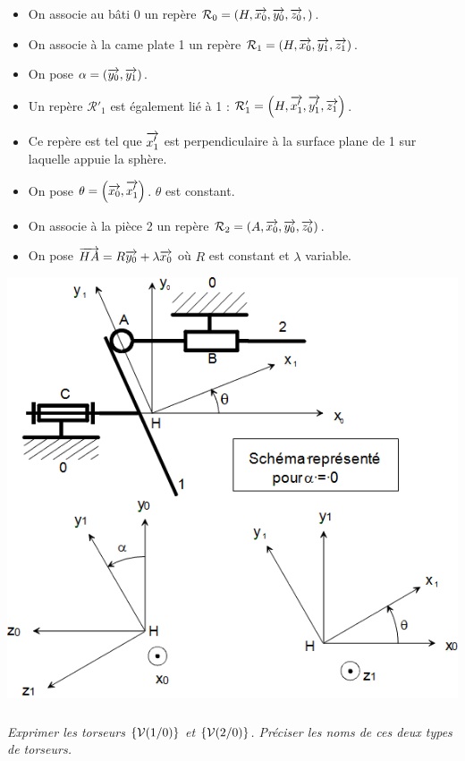 \documentclass[10pt,oneside]{article}
\begin{document}
\begin{itemize}
\item On associe au bâti 0 un repère $\mathcal{R}_0=\left(H,\overrightarrow{x_0},\overrightarrow{y_0},\overrightarrow{z_0}, \right)$.
\item On associe à la came plate 1 un repère  $\mathcal{R}_1=\left(H,\overrightarrow{x_0},\overrightarrow{y_1},\overrightarrow{z_1} \right)$. 
\item On pose  $\alpha=\left( \overrightarrow{y_0}, \overrightarrow{y_1}\right)$.
\item Un repère $\mathcal{R}'_1$ est également lié à 1 : $\mathcal{R}'_1=\left(H,\overrightarrow{x'_1},\overrightarrow{y'_1},\overrightarrow{z_1} \right)$. 
\item Ce repère est tel que $\overrightarrow{x'_1}$ est perpendiculaire à la surface plane de 1 sur laquelle appuie la sphère.
\item On pose $\theta= \left( \overrightarrow{x_0}, \overrightarrow{x'_1}\right)$. $\theta$ est constant.
\item On associe à la pièce 2 un repère  $\mathcal{R}_2=\left(A,\overrightarrow{x_0},\overrightarrow{y_0},\overrightarrow{z_0} \right)$. 
\item On pose $\overrightarrow{HA}=R\overrightarrow{y_0}+\lambda\overrightarrow{x_0}$ où $R$ est constant et $\lambda$ variable.
\end{itemize}

\begin{center}
\includegraphics[width=.6\textwidth]{png/fig_01}
\end{center}

\subparagraph{}
\textit{Exprimer les torseurs $\left\{{\mathcal{V}(1/0)}\right\}$ et $\left\{{\mathcal{V}(2/0)}\right\}$. Préciser les noms de ces deux types de torseurs.}
\end{document}

